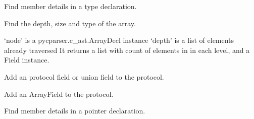 \documentclass[A4paper,10pt,english]{sphinxmanual}
\begin{document}
\begin{fulllineitems}
\begin{fulllineitems}
\end{fulllineitems}


\begin{fulllineitems}
\label{devel/code:cparser.StructVisitor.handle_type_decl}
Find member details in a type declaration.

\end{fulllineitems}


\begin{fulllineitems}
\label{devel/code:cparser.StructVisitor.handle_array_decl}
Find the depth, size and type of the array.

`node' is a pycparser.c\_ast.ArrayDecl instance
`depth' is a list of elements already traversed
It returns a list with count of elements in in each level,
and a Field instance.

\end{fulllineitems}


\begin{fulllineitems}
\label{devel/code:cparser.StructVisitor.handle_protocol}
Add an protocol field or union field to the protocol.

\end{fulllineitems}


\begin{fulllineitems}
\label{devel/code:cparser.StructVisitor.handle_array}
Add an ArrayField to the protocol.

\end{fulllineitems}


\begin{fulllineitems}
\label{devel/code:cparser.StructVisitor.handle_pointer}
Find member details in a pointer declaration.


\end{fulllineitems}
\end{fulllineitems}
\end{document}
